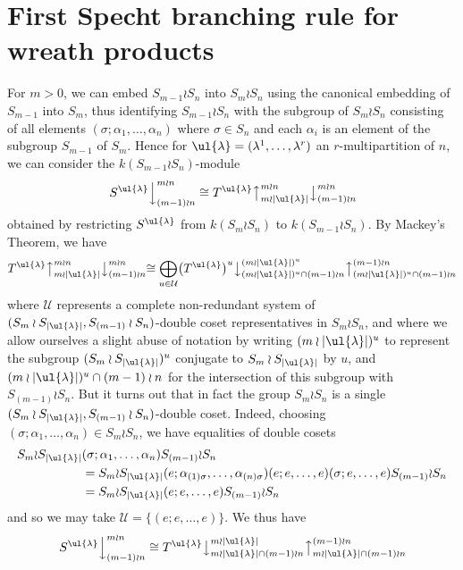 \section{First Specht branching rule for wreath products}
For $m>0$, we can embed $S_{m-1} \wr S_n$ into $S_m \wr S_n$ using the canonical embedding of $S_{m-1}$ into $S_m$, thus identifying
$S_{m-1} \wr S_n$ with the subgroup of $S_m \wr S_n$ consisting of all elements $(\sigma;\alpha_1,\ldots,\alpha_n)$ where $\sigma \in S_n$
and each $\alpha_i$ is an element of the subgroup $S_{m-1}$ of $S_m$. Hence for $\ul{\lambda} = (\lambda^1,\ldots,\lambda^r)$ an
$r$-multipartition of $n$, we can consider the $k(S_{m-1} \wr S_n)$-module
\[ \left.S^{\ul{\lambda}}\right\downarrow^{m \wr n}_{(m-1) \wr n} \cong
T^{\ul{\lambda}}\bigl\uparrow^{m{\wr}n}_{m{\wr}|\ul{\lambda}|}\bigl\downarrow^{m \wr n}_{(m-1) \wr n}\]
obtained by restricting $S^{\ul{\lambda}}$ from $k(S_m \wr S_n)$ to $k(S_{m-1} \wr S_n)$. By  Mackey's Theorem, we have
\[
T^{\ul{\lambda}}\bigl\uparrow^{m{\wr}n}_{m{\wr}|\ul{\lambda}|}\bigl\downarrow^{m \wr n}_{(m-1) \wr n}\cong
\bigoplus_{u \in \mathcal{U}}\bigl(T^{\ul{\lambda}}\bigr)^u\bigl\downarrow^{(m{\wr}|\ul{\lambda}|)^u}_{(m{\wr}|\ul{\lambda}|)^u \cap (m-1) \wr n}
\bigl\uparrow^{(m-1) \wr n}_{(m{\wr}|\ul{\lambda}|)^u\cap (m-1) \wr n}
\]
where $\mathcal{U}$ represents a complete
non-redundant system of $(S_m \wr S_{|\ul{\lambda}|},S_{(m-1)} \wr S_n)$-double coset representatives in $S_m \wr S_n$, and where we allow
ourselves a slight abuse of notation by writing $(m \wr |\ul{\lambda}|)^u$ to represent the subgroup $(S_m \wr S_{|\ul{\lambda}|})^u$
conjugate to $S_m \wr S_{|\ul{\lambda}|}$ by $u$, and  $(m \wr |\ul{\lambda}|)^u \cap(m-1) \wr n$ for the intersection of this subgroup
with $S_{(m-1)} \wr S_n$. But it turns out that in fact the group $S_m \wr S_n$ is a single
$(S_m \wr S_{|\ul{\lambda}|},S_{(m-1)} \wr S_n)$-double coset. Indeed, choosing $(\sigma;\alpha_1,\ldots,\alpha_n)
\in S_m \wr S_n$, we have equalities of double cosets
\begin{align*}
S_m{\wr}S_{|\ul{\lambda}|}&(\sigma;\alpha_1,\ldots,\alpha_n)S_{(m-1)}{\wr}S_n\\
& = S_m{\wr}S_{|\ul{\lambda}|}(e;\alpha_{(1)\sigma},\ldots,\alpha_{(n)\sigma})(e;e,\ldots,e)(\sigma;e,\ldots,e)S_{(m-1)}{\wr}S_n\\
& = S_m{\wr}S_{|\ul{\lambda}|}(e;e,\ldots,e)S_{(m-1)}{\wr}S_n
\end{align*}
and so we may take $\mathcal{U} = \{(e;e,\ldots,e)\}$. We thus have
\[
\left.S^{\ul{\lambda}}\right\downarrow^{m \wr n}_{(m-1) \wr n} \cong
T^{\ul{\lambda}}\bigl\downarrow^{m{\wr}|\ul{\lambda}|}_{m{\wr}|\ul{\lambda}| \cap(m-1) \wr n}
\bigl\uparrow^{(m-1) \wr n}_{m{\wr}|\ul{\lambda}| \cap(m-1) \wr n}
\]
